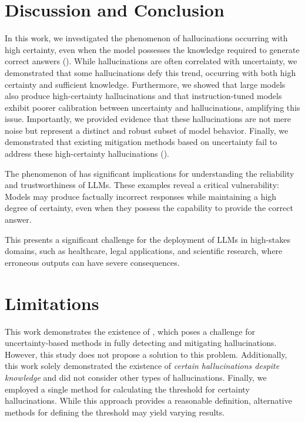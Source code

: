 
\section{Discussion and Conclusion}
In this work, we investigated the phenomenon of hallucinations occurring with high certainty, even when the model possesses the knowledge required to generate correct answers (\chk). While hallucinations are often correlated with uncertainty, we demonstrated that some hallucinations defy this trend, occurring with both high certainty and sufficient knowledge. Furthermore, we showed that large models also produce high-certainty hallucinations and that instruction-tuned models exhibit poorer calibration between uncertainty and hallucinations, amplifying this issue. Importantly, we provided evidence that these hallucinations are not mere noise but represent a distinct and robust subset of model behavior. Finally, we demonstrated that existing mitigation methods based on uncertainty fail to address these high-certainty hallucinations (\chk). 

The phenomenon of \chk has significant implications for understanding the reliability and trustworthiness of LLMs. These examples reveal a critical vulnerability: Models may produce factually incorrect responses while
 maintaining a high degree of certainty, even when they possess the capability to provide the correct answer.

This presents a significant challenge for the deployment of LLMs in high-stakes domains, such as healthcare, legal applications, and scientific research, where erroneous outputs can have severe consequences.



\section{Limitations}

This work demonstrates the existence of \chk, which poses a challenge for uncertainty-based methods in fully detecting and mitigating hallucinations. However, this study does not propose a solution to this problem.
 Additionally, this work solely demonstrated the existence of \emph{certain hallucinations despite knowledge} and did not consider other types of hallucinations. Finally, we employed a single method for calculating the threshold for certainty hallucinations. While this approach provides a reasonable definition, alternative methods for defining the threshold may yield varying results.
